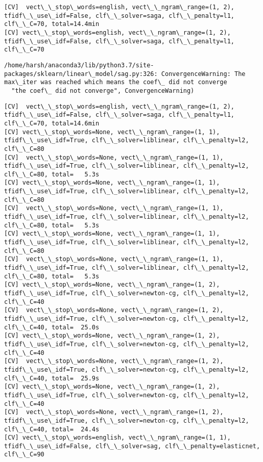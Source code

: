 \documentclass[11pt]{article}
\begin{document}
    \begin{Verbatim}[commandchars=\\\{\}]
[CV]  vect\_\_stop\_words=english, vect\_\_ngram\_range=(1, 2), tfidf\_\_use\_idf=False, clf\_\_solver=saga, clf\_\_penalty=l1, clf\_\_C=70, total=14.4min
[CV] vect\_\_stop\_words=english, vect\_\_ngram\_range=(1, 2), tfidf\_\_use\_idf=False, clf\_\_solver=saga, clf\_\_penalty=l1, clf\_\_C=70 

    \end{Verbatim}

    \begin{Verbatim}[commandchars=\\\{\}]
/home/harsh/anaconda3/lib/python3.7/site-packages/sklearn/linear\_model/sag.py:326: ConvergenceWarning: The max\_iter was reached which means the coef\_ did not converge
  "the coef\_ did not converge", ConvergenceWarning)

    \end{Verbatim}

    \begin{Verbatim}[commandchars=\\\{\}]
[CV]  vect\_\_stop\_words=english, vect\_\_ngram\_range=(1, 2), tfidf\_\_use\_idf=False, clf\_\_solver=saga, clf\_\_penalty=l1, clf\_\_C=70, total=14.6min
[CV] vect\_\_stop\_words=None, vect\_\_ngram\_range=(1, 1), tfidf\_\_use\_idf=True, clf\_\_solver=liblinear, clf\_\_penalty=l2, clf\_\_C=80 
[CV]  vect\_\_stop\_words=None, vect\_\_ngram\_range=(1, 1), tfidf\_\_use\_idf=True, clf\_\_solver=liblinear, clf\_\_penalty=l2, clf\_\_C=80, total=   5.3s
[CV] vect\_\_stop\_words=None, vect\_\_ngram\_range=(1, 1), tfidf\_\_use\_idf=True, clf\_\_solver=liblinear, clf\_\_penalty=l2, clf\_\_C=80 
[CV]  vect\_\_stop\_words=None, vect\_\_ngram\_range=(1, 1), tfidf\_\_use\_idf=True, clf\_\_solver=liblinear, clf\_\_penalty=l2, clf\_\_C=80, total=   5.3s
[CV] vect\_\_stop\_words=None, vect\_\_ngram\_range=(1, 1), tfidf\_\_use\_idf=True, clf\_\_solver=liblinear, clf\_\_penalty=l2, clf\_\_C=80 
[CV]  vect\_\_stop\_words=None, vect\_\_ngram\_range=(1, 1), tfidf\_\_use\_idf=True, clf\_\_solver=liblinear, clf\_\_penalty=l2, clf\_\_C=80, total=   5.3s
[CV] vect\_\_stop\_words=None, vect\_\_ngram\_range=(1, 2), tfidf\_\_use\_idf=True, clf\_\_solver=newton-cg, clf\_\_penalty=l2, clf\_\_C=40 
[CV]  vect\_\_stop\_words=None, vect\_\_ngram\_range=(1, 2), tfidf\_\_use\_idf=True, clf\_\_solver=newton-cg, clf\_\_penalty=l2, clf\_\_C=40, total=  25.0s
[CV] vect\_\_stop\_words=None, vect\_\_ngram\_range=(1, 2), tfidf\_\_use\_idf=True, clf\_\_solver=newton-cg, clf\_\_penalty=l2, clf\_\_C=40 
[CV]  vect\_\_stop\_words=None, vect\_\_ngram\_range=(1, 2), tfidf\_\_use\_idf=True, clf\_\_solver=newton-cg, clf\_\_penalty=l2, clf\_\_C=40, total=  25.9s
[CV] vect\_\_stop\_words=None, vect\_\_ngram\_range=(1, 2), tfidf\_\_use\_idf=True, clf\_\_solver=newton-cg, clf\_\_penalty=l2, clf\_\_C=40 
[CV]  vect\_\_stop\_words=None, vect\_\_ngram\_range=(1, 2), tfidf\_\_use\_idf=True, clf\_\_solver=newton-cg, clf\_\_penalty=l2, clf\_\_C=40, total=  24.4s
[CV] vect\_\_stop\_words=english, vect\_\_ngram\_range=(1, 1), tfidf\_\_use\_idf=False, clf\_\_solver=sag, clf\_\_penalty=elasticnet, clf\_\_C=90 

    \end{Verbatim}
\end{document}
